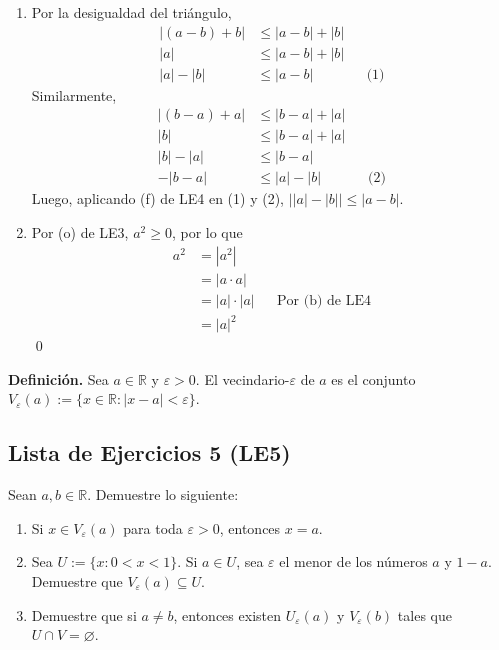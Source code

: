 \documentclass[11pt]{article}
\newcommand{\R}{\mathbb{R}}
\let\emptyset\varnothing
\begin{document}
\begin{enumerate}[label=\alph*)]
    
    \item Por la desigualdad del triángulo,
        \begin{align*}
            |(a-b)+b| &\leq |a-b|+|b| \\
            |a| &\leq |a-b|+|b| \\
            |a|-|b| &\leq |a-b| && \text{(1)}
        \end{align*}
        Similarmente, 
        \begin{align*}
            |(b-a)+a| &\leq |b-a|+|a| \\
            |b| &\leq |b-a|+|a| \\
            |b|-|a| &\leq |b-a| \\
            -|b-a| &\leq |a|-|b| && \text{(2)}
        \end{align*}
        Luego, aplicando (f) de LE4 en (1) y (2), $\big| |a| - |b| \big| \leq |a-b|$.


    \item Por (o) de LE3, $a^2\geq 0$, por lo que \begin{align*}
        a^2 &= |a^2|\\
        &= |a\cdot a|\\
        &= |a| \cdot |a| && \text{Por (b) de LE4}\\
        &= |a|^2
    \end{align*} \qed
\end{enumerate} 


\textbf{Definición.} Sea $a \in \R$ y $\varepsilon>0$. El vecindario-$\varepsilon$ de $a$ es el conjunto $V_\varepsilon(a):=\{ x\in \R: |x-a|<\varepsilon\}$.

\subsection*{Lista de Ejercicios 5 (LE5)}

Sean $a,b \in \R$. Demuestre lo siguiente:

\begin{enumerate}[label=\alph*)]
    \item Si $x\in V_\varepsilon(a)$ para toda $\varepsilon>0$, entonces $x=a$.
    \item Sea $U:=\{x: 0<x<1\}$. Si $a\in U$, sea $\varepsilon$ el menor de los números $a$ y $1-a$. Demuestre que $V_\varepsilon(a) \subseteq U$.
    \item Demuestre que si $a\neq b$, entonces existen $U_\varepsilon(a)$ y $V_\varepsilon(b)$ tales que $U\cap V =\emptyset$.
\end{enumerate}
\end{document}
